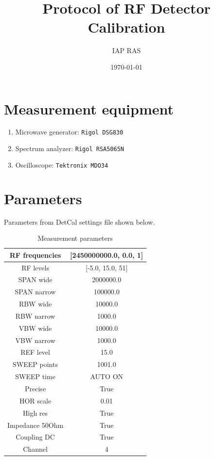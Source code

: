 \documentclass
[12pt,a4paper]
{article}
\title{Protocol of RF Detector Calibration}
\author{IAP RAS}
\date{\today}
\begin{document}
\maketitle

\section{Measurement equipment}


\begin{enumerate}
    \item Microwave generator: \texttt{Rigol DSG830}
    \item Spectrum analyzer: \texttt{Rigol RSA5065N}
    \item Oscilloscope: \texttt{Tektronix MDO34}
\end{enumerate}

\section{Parameters}
Parameters from DetCal settings file shown below.

\begin{table}[htbp]
\centering
\begin{tabular}{|c|c|}
\hline
RF frequencies & [2450000000.0, 0.0, 1] \\
\hline
RF levels & [-5.0, 15.0, 51] \\
\hline
SPAN wide & 2000000.0 \\
\hline
SPAN narrow & 100000.0 \\
\hline
RBW wide & 10000.0 \\
\hline
RBW narrow & 1000.0 \\
\hline
VBW wide & 10000.0 \\
\hline
VBW narrow & 1000.0 \\
\hline
REF level & 15.0 \\
\hline
SWEEP points & 1001.0 \\
\hline
SWEEP time & AUTO ON \\
\hline
Precise & True \\
\hline
HOR scale & 0.01 \\
\hline
High res & True \\
\hline
Impedance 50Ohm & True \\
\hline
Coupling DC & True \\
\hline
Channel & 4 \\
\hline
\end{tabular}
\caption{Measurement parameters}
\label{params}
\end{table}
\end{document}
